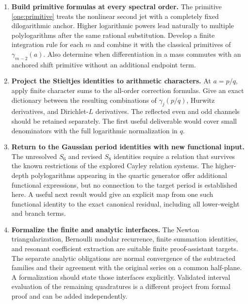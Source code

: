 \documentclass[11pt,a4paper]{article}
\numberwithin{equation}{section}
\theoremstyle{plain}
\theoremstyle{definition}
\theoremstyle{remark}
\begin{document}
\begin{enumerate}[leftmargin=*,label=\textbf{R\arabic*.}]
\item \textbf{Build primitive formulas at every spectral order.}
The primitive \eqref{one:primitive} treats the nonlinear second jet
with a completely fixed dilogarithmic anchor.  Higher logarithmic
powers lead naturally to multiple polylogarithms after the same
rational substitution.  Develop a finite integration rule for each
$m$ and combine it with the classical primitives of
$\gamma_{m-2}(a)$.  Also determine when differentiation in a mass
commutes with an anchored shift primitive without an additional
endpoint term.

\item \textbf{Project the Stieltjes identities to arithmetic characters.}
At $a=p/q$, apply finite character sums to the all-order correction
formulas.  Give an exact dictionary between the resulting combinations
of $\gamma_j(p/q)$, Hurwitz derivatives, and Dirichlet-$L$ derivatives.
The reflected even and odd channels should be retained separately.
The first useful deliverable would cover small denominators with
the full logarithmic normalization in $q$.

\item \textbf{Return to the Gaussian period identities with new functional input.}
The unresolved $S_6$ and revised $S_8$ identities require a relation
that survives the known restrictions of the explored Cayley relation
systems.  The higher-depth polylogarithms appearing in the quartic
generator offer additional functional expressions, but no connection
to the target period is established here.  A useful next result would
give an explicit map from one such functional identity to the exact
canonical residual, including all lower-weight and branch terms.

\item \textbf{Formalize the finite and analytic interfaces.}
The Newton triangularization, Bernoulli modular recurrence, finite
summation identities, and resonant coefficient extraction are suitable
finite proof-assistant targets.  The separate analytic obligations are
normal convergence of the subtracted families and their agreement
with the original series on a common half-plane.  A formalization
should state those interfaces explicitly.  Validated interval
evaluation of the remaining quadratures is a different project from
formal proof and can be added independently.
\end{enumerate}


\appendix
\end{document}
